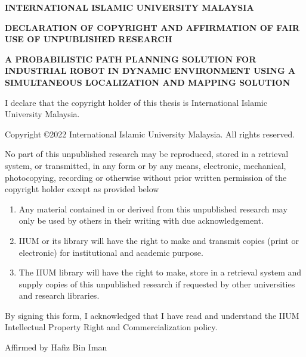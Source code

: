 
\begin{mdframed}
\begin{center}
{\CHAPTERfontsize \textbf{INTERNATIONAL ISLAMIC UNIVERSITY MALAYSIA}}
\vspace{24pt}
\par
{\CHAPTERfontsize \textbf{DECLARATION OF COPYRIGHT AND AFFIRMATION OF
FAIR USE OF UNPUBLISHED RESEARCH}}
\vspace{24pt}
\par
{\CHAPTERfontsize \uppercase{\textbf{
	A Probabilistic Path Planning Solution for Industrial Robot in Dynamic Environment using A Simultaneous Localization and Mapping Solution
}}}
\vspace{24pt}
\par
\noindent
I declare that the copyright holder of this thesis is International Islamic University Malaysia.
\par
\vspace{12pt}
\noindent
\footnotesize{Copyright \copyright 2022 International Islamic University Malaysia. All rights reserved.}
\end{center}
\par
  \vspace{12pt}
  \noindent
No part of this unpublished research may be reproduced, stored in a retrieval
system, or transmitted, in any form or by any means, electronic, mechanical,
photocopying, recording or otherwise without prior written permission of the
copyright holder except as provided below
\begin{enumerate}
\item Any material contained in or derived from this unpublished research
may only be used by others in their writing with due acknowledgement.
\item IIUM or its library will have the right to make and transmit copies
(print or electronic) for institutional and academic purpose.
\item The IIUM library will have the right to make, store in a retrieval system
and supply copies of this unpublished research if requested by other
universities and research libraries.
\end{enumerate}
By signing this form, I acknowledged that I have read and understand the
IIUM Intellectual Property Right and Commercialization policy.
\par
\vspace{48pt}
\noindent Affirmed by Hafiz Bin Iman
\par
  \vspace{72pt}
  \noindent
  \begin{minipage}{0.4\linewidth}
    \centering
  \end{minipage}
  \hfill
  \begin{minipage}{0.4\linewidth}
    \centering
    \Date
  \end{minipage}

  \vspace{21pt}
\end{mdframed}
\newpage

